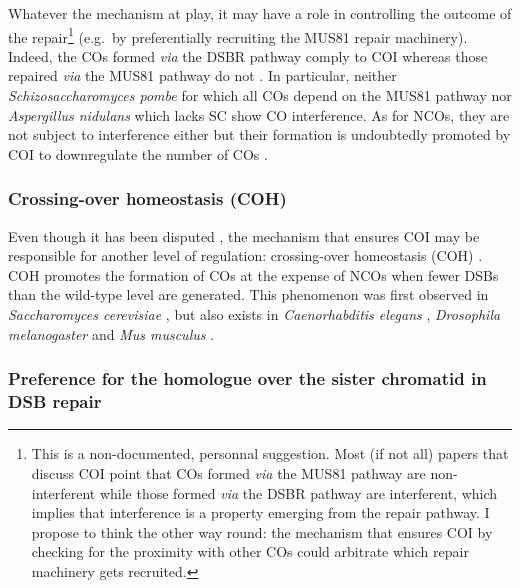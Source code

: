 Whatever the mechanism at play, it may have a role in controlling the outcome of the repair\footnote{This is a non-documented, personnal suggestion. Most (if not all) papers that discuss COI point that COs formed \textit{via} the MUS81 pathway are non-interferent while those formed \textit{via} the DSBR pathway are interferent, which implies that interference is a property emerging from the repair pathway. I propose to think the other way round: the mechanism that ensures COI by checking for the proximity with other COs could arbitrate which repair machinery gets recruited.} (e.g.\ by preferentially recruiting the MUS81 repair machinery).
Indeed, the COs formed \textit{via} the DSBR pathway comply to COI whereas those repaired \textit{via} the MUS81 pathway do not \citep{santos2003mus81,kohl2013meiotic}.
In particular, neither \textit{Schizosaccharomyces pombe} for which all COs depend on the MUS81 pathway \citep{munz1994analysis,hollingsworth2004mus81,cromie2006single} nor \textit{Aspergillus nidulans} which lacks SC \citep[reviewed in \citealp{shaw1998meiosis} and \citealp{egel1995synaptonemal}]{strickland1958analysis} show CO interference.
As for NCOs, they are not subject to interference either \citep{malkova2004gene,baudat2007regulating,miller2016wholegenome} but their formation is undoubtedly promoted by COI to downregulate the number of COs \citep{rockmill2003sgs1,youds2010rtel1,crismani2012fancm,seguela-arnaud2015multiple}.



\subsubsection{Crossing-over homeostasis (COH)}
Even though it has been disputed \citep{shinohara2008crossover}, the mechanism that ensures COI may be responsible for another level of regulation: crossing-over homeostasis (COH) \citep[reviewed in \citealp{youds2011choice}]{joshi2009pch2,zanders2009pch2delta}.
COH promotes the formation of COs at the expense of NCOs when fewer DSBs than the wild-type level are generated.
This phenomenon was first observed in \textit{Saccharomyces cerevisiae} \citep{martini2006crossover,chen2008global}, but also exists in \textit{Caenorhabditis elegans} \citep{yokoo2012cosa1,globus2012joy}, \textit{Drosophila melanogaster} \citep{mehrotra2006temporal} and \textit{Mus musculus} \citep{cole2012homeostatic}.



\subsubsection{Preference for the homologue over the sister chromatid in DSB repair}

